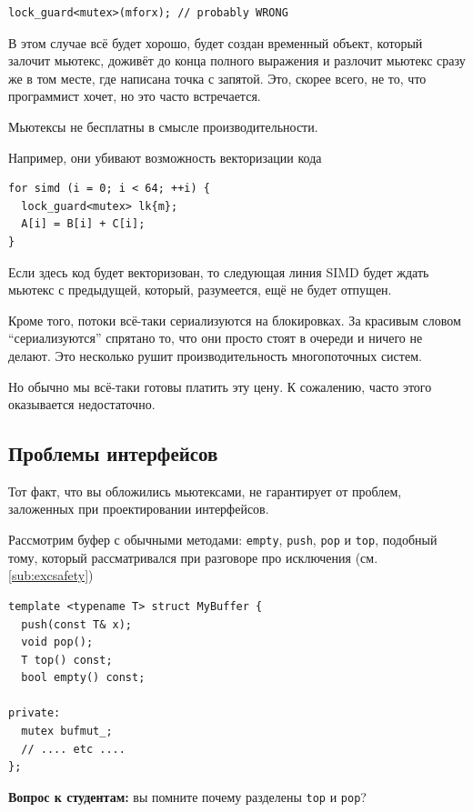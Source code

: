 \documentclass[a4paper,12pt,oneside]{book}
\begin{document}
\begin{lstlisting}
lock_guard<mutex>(mforx); // probably WRONG
\end{lstlisting}

В этом случае всё будет хорошо, будет создан временный объект, который залочит мьютекс, доживёт до конца полного выражения и разлочит мьютекс сразу же в том месте, где написана точка с запятой. Это, скорее всего, не то, что программист хочет, но это часто встречается.

Мьютексы не бесплатны в смысле производительности.

Например, они убивают возможность векторизации кода

\begin{lstlisting}
for simd (i = 0; i < 64; ++i) {
  lock_guard<mutex> lk{m};
  A[i] = B[i] + C[i];
}
\end{lstlisting}

Если здесь код будет векторизован, то следующая линия SIMD будет ждать мьютекс с предыдущей, который, разумеется, ещё не будет отпущен.

Кроме того, потоки всё-таки сериализуются на блокировках. За красивым словом ``сериализуются'' спрятано то, что они просто стоят в очереди и ничего не делают. Это несколько рушит производительность многопоточных систем.

Но обычно мы всё-таки готовы платить эту цену. К сожалению, часто этого оказывается недостаточно.

\subsection{Проблемы интерфейсов}\label{sub:mutintf}

Тот факт, что вы обложились мьютексами, не гарантирует от проблем, заложенных при проектировании интерфейсов.

Рассмотрим буфер с обычными методами: \lstinline!empty!, \lstinline!push!, \lstinline!pop! и \lstinline!top!, подобный тому, который рассматривался при разговоре про исключения (см. \ref{sub:excsafety})

\begin{lstlisting}
template <typename T> struct MyBuffer {
  push(const T& x);
  void pop();
  T top() const;
  bool empty() const;

private:
  mutex bufmut_;
  // .... etc ....
};
\end{lstlisting}

\textbf{Вопрос к студентам:} вы помните почему разделены \lstinline!top! и \lstinline!pop!?
\end{document}
